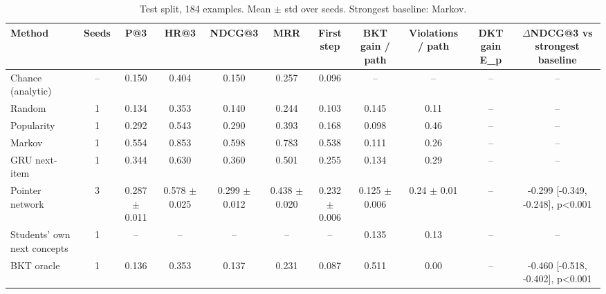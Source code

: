 \begin{table}[t]
\centering\small
\caption{Test split, 184 examples. Mean $\pm$ std over seeds. Strongest baseline: Markov.}
\begin{tabular}{lcccccccccc}
\toprule
Method & Seeds & P@3 & HR@3 & NDCG@3 & MRR & First step & BKT gain / path & Violations / path & DKT gain E\_p & $\Delta$NDCG@3 vs strongest baseline \\
\midrule
Chance (analytic) & -- & 0.150 & 0.404 & 0.150 & 0.257 & 0.096 & -- & -- & -- & -- \\
Random & 1 & 0.134 & 0.353 & 0.140 & 0.244 & 0.103 & 0.145 & 0.11 & -- & -- \\
Popularity & 1 & 0.292 & 0.543 & 0.290 & 0.393 & 0.168 & 0.098 & 0.46 & -- & -- \\
Markov & 1 & 0.554 & 0.853 & 0.598 & 0.783 & 0.538 & 0.111 & 0.26 & -- & -- \\
GRU next-item & 1 & 0.344 & 0.630 & 0.360 & 0.501 & 0.255 & 0.134 & 0.29 & -- & -- \\
Pointer network & 3 & 0.287 $\pm$ 0.011 & 0.578 $\pm$ 0.025 & 0.299 $\pm$ 0.012 & 0.438 $\pm$ 0.020 & 0.232 $\pm$ 0.006 & 0.125 $\pm$ 0.006 & 0.24 $\pm$ 0.01 & -- & -0.299 [-0.349, -0.248], p<0.001 \\
Students' own next concepts & 1 & -- & -- & -- & -- & -- & 0.135 & 0.13 & -- & -- \\
BKT oracle & 1 & 0.136 & 0.353 & 0.137 & 0.231 & 0.087 & 0.511 & 0.00 & -- & -0.460 [-0.518, -0.402], p<0.001 \\
\bottomrule
\end{tabular}
\end{table}
